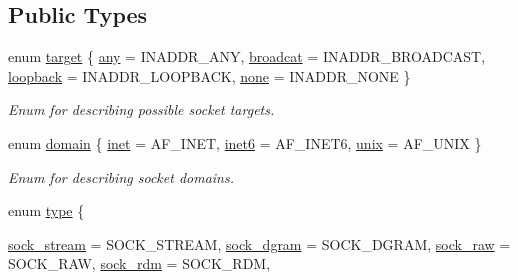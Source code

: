 \subsection*{Public Types}
\begin{CompactItemize}
\item 
enum \hyperlink{classusock_1_1BaseSocket_50d8769de87937b42f8cef370917aa0b}{target} \{ \hyperlink{classusock_1_1BaseSocket_50d8769de87937b42f8cef370917aa0b13bac8e60708dc8451b1addafbd3dd77}{any} =  INADDR\_\-ANY, 
\hyperlink{classusock_1_1BaseSocket_50d8769de87937b42f8cef370917aa0b1bf59b5083e7c55e7bf86ec50291d617}{broadcat} =  INADDR\_\-BROADCAST, 
\hyperlink{classusock_1_1BaseSocket_50d8769de87937b42f8cef370917aa0bbefd2832243f347df978af6409917c38}{loopback} =  INADDR\_\-LOOPBACK, 
\hyperlink{classusock_1_1BaseSocket_50d8769de87937b42f8cef370917aa0b2e5c5b23744de44c69004e477510d95b}{none} =  INADDR\_\-NONE
 \}
\begin{CompactList}\small\item\em Enum for describing possible socket targets. \item\end{CompactList}\item 
enum \hyperlink{classusock_1_1BaseSocket_a51cae0b366638a5f697f64174135d90}{domain} \{ \hyperlink{classusock_1_1BaseSocket_a51cae0b366638a5f697f64174135d904293c75d794987e0017bab42bbbcbf73}{inet} =  AF\_\-INET, 
\hyperlink{classusock_1_1BaseSocket_a51cae0b366638a5f697f64174135d9089db67cd78ea92b1ca5bf823ca967680}{inet6} =  AF\_\-INET6, 
\hyperlink{classusock_1_1BaseSocket_a51cae0b366638a5f697f64174135d90e69268b071304bbb353e8686f5c7a88a}{unix} =  AF\_\-UNIX
 \}
\begin{CompactList}\small\item\em Enum for describing socket domains. \item\end{CompactList}\item 
enum \hyperlink{classusock_1_1BaseSocket_8117d25c7b482eb594d68137868ce5f9}{type} \{ \par
\hyperlink{classusock_1_1BaseSocket_8117d25c7b482eb594d68137868ce5f94052647af14af3924e9b994a5ab53b8e}{sock\_\-stream} =  SOCK\_\-STREAM, 
\hyperlink{classusock_1_1BaseSocket_8117d25c7b482eb594d68137868ce5f95b0f0651f7544fbc1fedc8997d914365}{sock\_\-dgram} =  SOCK\_\-DGRAM, 
\hyperlink{classusock_1_1BaseSocket_8117d25c7b482eb594d68137868ce5f9d3b8cbf378c46eb82b5a0039eab34ca7}{sock\_\-raw} =  SOCK\_\-RAW, 
\hyperlink{classusock_1_1BaseSocket_8117d25c7b482eb594d68137868ce5f9e04a390261efe04335235f26a00b72d5}{sock\_\-rdm} =  SOCK\_\-RDM, 

\end{CompactItemize}
